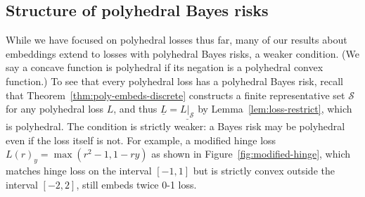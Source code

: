 \documentclass[11pt]{article}
\newcommand{\Comments}{1}
\newcommand{\mynote}[2]{\ifnum\Comments=1\textcolor{#1}{#2}\fi}
\newcommand{\raf}[1]{\mynote{darkgreen}{[RF: #1]}}
\newcommand{\jessie}[1]{\mynote{teal}{[JF: #1]}}
\newcommand{\Sc}{\mathcal{S}}
\newcommand{\risk}[1]{\underline{#1}}
\begin{document}

\subsection{Structure of polyhedral Bayes risks}

While we have focused on polyhedral losses thus far, many of our results about embeddings extend to losses with polyhedral Bayes risks, a weaker condition.
(We say a concave function is polyhedral if its negation is a polyhedral convex function.)
To see that every polyhedral loss has a polyhedral Bayes risk, recall that Theorem~\ref{thm:poly-embeds-discrete} constructs a finite representative set $\Sc$ for any polyhedral loss $L$, and thus $\risk{L} = \risk{L|_\Sc}$ by Lemma~\ref{lem:loss-restrict}, which is polyhedral.
The condition is strictly weaker: a Bayes risk may be polyhedral even if the loss itself is not.
For example, a modified hinge loss $L(r)_y = \max(r^2-1,1-ry)$
as shown in Figure~\ref{fig:modified-hinge}, which matches hinge loss on the interval $[-1,1]$ but is strictly convex outside the interval $[-2,2]$, still embeds twice 0-1 loss.
\end{document}
